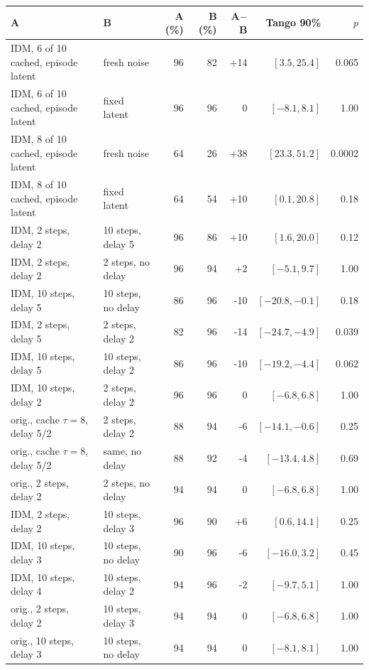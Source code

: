 \begin{tabular}{@{}llrrrrr@{}}
\toprule
A & B & A (\%) & B (\%) & A$-$B & Tango 90\% & $p$ \\
\midrule
IDM, 6 of 10 cached, episode latent & fresh noise & 96 & 82 & +14 & $[3.5, 25.4]$ & 0.065 \\
IDM, 6 of 10 cached, episode latent & fixed latent & 96 & 96 & 0 & $[-8.1, 8.1]$ & 1.00 \\
IDM, 8 of 10 cached, episode latent & fresh noise & 64 & 26 & +38 & $[23.3, 51.2]$ & 0.0002 \\
IDM, 8 of 10 cached, episode latent & fixed latent & 64 & 54 & +10 & $[0.1, 20.8]$ & 0.18 \\
\midrule
IDM, 2 steps, delay 2 & 10 steps, delay 5 & 96 & 86 & +10 & $[1.6, 20.0]$ & 0.12 \\
IDM, 2 steps, delay 2 & 2 steps, no delay & 96 & 94 & +2 & $[-5.1, 9.7]$ & 1.00 \\
IDM, 10 steps, delay 5 & 10 steps, no delay & 86 & 96 & -10 & $[-20.8, -0.1]$ & 0.18 \\
IDM, 2 steps, delay 5 & 2 steps, delay 2 & 82 & 96 & -14 & $[-24.7, -4.9]$ & 0.039 \\
IDM, 10 steps, delay 5 & 10 steps, delay 2 & 86 & 96 & -10 & $[-19.2, -4.4]$ & 0.062 \\
IDM, 10 steps, delay 2 & 2 steps, delay 2 & 96 & 96 & 0 & $[-6.8, 6.8]$ & 1.00 \\
\midrule
orig., cache $\tau{=}8$, delay 5/2 & 2 steps, delay 2 & 88 & 94 & -6 & $[-14.1, -0.6]$ & 0.25 \\
orig., cache $\tau{=}8$, delay 5/2 & same, no delay & 88 & 92 & -4 & $[-13.4, 4.8]$ & 0.69 \\
orig., 2 steps, delay 2 & 2 steps, no delay & 94 & 94 & 0 & $[-6.8, 6.8]$ & 1.00 \\
\midrule
IDM, 2 steps, delay 2 & 10 steps, delay 3 & 96 & 90 & +6 & $[0.6, 14.1]$ & 0.25 \\
IDM, 10 steps, delay 3 & 10 steps, no delay & 90 & 96 & -6 & $[-16.0, 3.2]$ & 0.45 \\
IDM, 10 steps, delay 4 & 10 steps, delay 2 & 94 & 96 & -2 & $[-9.7, 5.1]$ & 1.00 \\
orig., 2 steps, delay 2 & 10 steps, delay 3 & 94 & 94 & 0 & $[-6.8, 6.8]$ & 1.00 \\
orig., 10 steps, delay 3 & 10 steps, no delay & 94 & 94 & 0 & $[-8.1, 8.1]$ & 1.00 \\
\bottomrule
\end{tabular}
